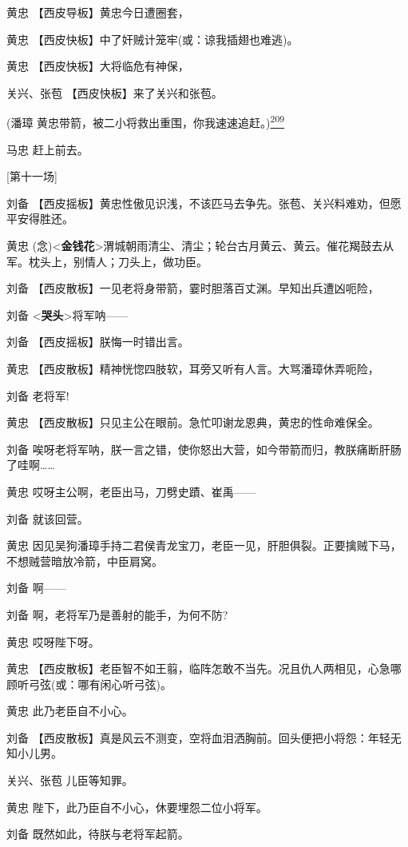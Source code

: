 黄忠 【西皮导板】黄忠今日遭圈套，

黄忠 【西皮快板】中了奸贼计笼牢(或：谅我插翅也难逃)。

黄忠 【西皮快板】大将临危有神保，

关兴、张苞 【西皮快板】来了关兴和张苞。

(潘璋
黄忠带箭，被二小将救出重围，你我速速追赶。)\protect\hyperlink{fn209}{\textsuperscript{209}}

马忠 赶上前去。

{[}第十一场{]}

刘备
【西皮摇板】黄忠性傲见识浅，不该匹马去争先。张苞、关兴料难劝，但愿平安得胜还。

黄忠
(念)\textless{}\textbf{金钱花}\textgreater{}渭城朝雨清尘、清尘；轮台古月黄云、黄云。催花羯鼓去从军。枕头上，别情人；刀头上，做功臣。

刘备 【西皮散板】一见老将身带箭，霎时胆落百丈渊。早知出兵遭凶呃险，

刘备 \textless{}\textbf{哭头}\textgreater{}将军呐------

刘备 【西皮摇板】朕悔一时错出言。

黄忠 【西皮散板】精神恍惚四肢软，耳旁又听有人言。大骂潘璋休弄呃险，

刘备 老将军!

黄忠 【西皮散板】只见主公在眼前。急忙叩谢龙恩典，黄忠的性命难保全。

刘备
唉呀老将军呐，朕一言之错，使你怒出大营，如今带箭而归，教朕痛断肝肠了哇啊\ldots{}\ldots{}

黄忠 哎呀主公啊，老臣出马，刀劈史蹟、崔禹------

刘备 就该回营。

黄忠
因见吴狗潘璋手持二君侯青龙宝刀，老臣一见，肝胆俱裂。正要擒贼下马，不想贼营暗放冷箭，中臣肩窝。

刘备 啊------

刘备 啊，老将军乃是善射的能手，为何不防?

黄忠 哎呀陛下呀。

黄忠
【西皮散板】老臣智不如王翦，临阵怎敢不当先。况且仇人两相见，心急哪顾听弓弦(或：哪有闲心听弓弦)。

黄忠 此乃老臣自不小心。

刘备
【西皮散板】真是风云不测变，空将血泪洒胸前。回头便把小将怨：年轻无知小儿男。

关兴、张苞 儿臣等知罪。

黄忠 陛下，此乃臣自不小心，休要埋怨二位小将军。

刘备 既然如此，待朕与老将军起箭。

